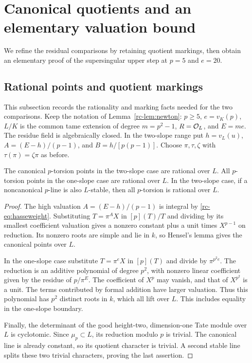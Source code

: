 \section{Canonical quotients and an elementary valuation bound}
We refine the residual comparisons by retaining quotient markings, then obtain an elementary proof of the supersingular upper step at \(p=5\) and \(e=20\).

\subsection{Rational points and quotient markings}
This subsection records the rationality and marking facts needed for the two comparisons.
Keep the notation of Lemma~\ref{rc-lem:newton}: \(p\geq5\), \(e=v_K(p)\), \(L/K\) is the common tame extension of degree \(m=p^2-1\), \(R=\mathcal O_L\), and \(E=me\). The residue field is algebraically closed. In the two-slope range put \(h=v_L(u)\), \(A=(E-h)/(p-1)\), and \(B=h/[p(p-1)]\). Choose \(\pi,\tau,\zeta\) with \(\tau(\pi)=\zeta\pi\) as before.

\begin{lemma}\label{fc-lem:rational}
The canonical \(p\)-torsion points in the two-slope case are rational over
\(L\). All \(p\)-torsion points in the one-slope case are rational over
\(L\). In the two-slope case, if a noncanonical \(p\)-line is also
\(L\)-stable, then all \(p\)-torsion is rational over \(L\).
\end{lemma}
\begin{proof}
The high valuation \(A=(E-h)/(p-1)\) is integral by \eqref{rc-eq:hasseweight}.
Substituting \(T=\pi^A X\) in \([p](T)/T\) and dividing by its smallest
coefficient valuation gives a nonzero constant plus a unit times
\(X^{p-1}\) on reduction. Its nonzero roots are simple and lie in \(k\),
so Hensel's lemma gives the canonical points over \(L\).

In the one-slope case substitute \(T=\pi^eX\) in \([p](T)\) and divide
by \(\pi^{p^2e}\). The reduction is an additive polynomial of degree
\(p^2\), with nonzero linear coefficient given by the residue of
\(p/\pi^E\). The coefficient of \(X^p\) may vanish, and that of
\(X^{p^2}\) is a unit. The terms contributed by formal addition have
larger valuation. Thus this polynomial has \(p^2\) distinct roots in
\(k\), which all lift over \(L\). This includes equality in the
one-slope boundary.

Finally, the determinant of the good height-two, dimension-one Tate
module over \(L\) is cyclotomic. Since \(\mu_p\subset L\), its reduction
modulo \(p\) is trivial. The canonical line is already constant, so its
quotient character is trivial. A second stable line splits these two
trivial characters, proving the last assertion.
\end{proof}


